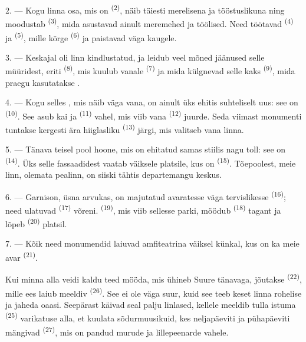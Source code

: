 2. --- Kogu linna osa, mis on  \textsuperscript{(2)}, näib täiesti
merelisena ja tööstuslikuna ning moodustab  \textsuperscript{(3)}, mida
asustavad ainult meremehed ja töölised. Need töötavad 
\textsuperscript{(4)} ja  \textsuperscript{(5)}, mille kõrge
 \textsuperscript{(6)} ja  paistavad väga kaugele.

3. --- Keskajal oli linn kindlustatud, ja leidub veel mõned jäänused selle müüridest,
eriti  \textsuperscript{(8)}, mis kuulub vanale  \textsuperscript{(7)} ja mida külgnevad selle kaks 
\textsuperscript{(9)}, mida praegu kasutatakse .

4. --- Kogu selles , mis näib väga vana, on ainult üks ehitis
suhteliselt uus: see on  \textsuperscript{(10)}. See asub kai ja
 \textsuperscript{(11)} vahel, mis viib vana 
\textsuperscript{(12)} juurde. Seda viimast monumenti tuntakse kergesti ära hiiglasliku
 \textsuperscript{(13)} järgi, mis valitseb vana linna.

5. --- Tänava teisel pool  hoone, mis on ehitatud samas stiilis nagu
toll: see on  \textsuperscript{(14)}. Üks selle fassaadidest vaatab
väiksele platsile, kus on  \textsuperscript{(15)}. Tõepoolest, meie
linn, olemata pealinn, on siiski tähtis departemangu keskus.

\VUsaut{5.0mm}
\VUsaut{3.4mm}

6. --- Garnison, üsna arvukas, on majutatud avaratesse väga tervislikesse
 \textsuperscript{(16)}; need ulatuvad 
\textsuperscript{(17)} võreni.  \textsuperscript{(19)}, mis viib sellesse
parki, möödub  \textsuperscript{(18)} tagant ja lõpeb
 \textsuperscript{(20)} platsil.

7. --- Kõik need monumendid laiuvad amfiteatrina väiksel künkal, kus on ka meie avar
 \textsuperscript{(21)}.

Kui minna alla veidi kaldu teed mööda, mis ühineb Suure tänavaga, jõutakse
 \textsuperscript{(22)}, mille ees laiub meeldiv 
\textsuperscript{(26)}. See  ei ole väga suur, kuid see teeb keset linna
rohelise ja jaheda oaasi. Seepärast käivad seal palju linlased, kellele meeldib tulla
istuma  \textsuperscript{(25)} varikatuse alla, et kuulata
sõdurmuusikuid, kes neljapäeviti ja pühapäeviti mängivad 
\textsuperscript{(27)}, mis on pandud murude ja lillepeenarde vahele.

